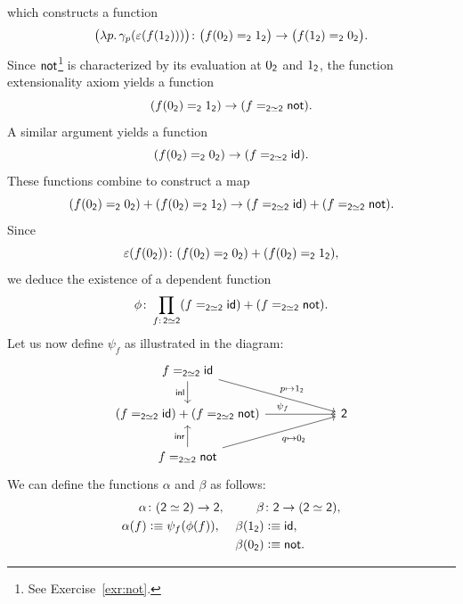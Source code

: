 \begin{solution}
\[    \]
    which constructs a function 
    \begin{align*}
        \bigl(\lambda p.\,\gamma_p(\varepsilon(f(1_{\fun2})))\bigr)
        \colon
        \bigl(f(0_{\fun2})\eq{\fun2}1_{\fun2}\bigr)
        \to
        \bigl(f(1_{\fun2})\eq{\fun2}0_{\fun2}\bigr).        
    \end{align*}
    Since $\mathsf{not}$\footnote{See Exercise~\ref{exr:not}.} is characterized by its evaluation at $0_{\mathsf{2}}$ and $1_{\mathsf{2}}$, the function extensionality axiom yields a function
    \[
        (f(0_{\mathsf{2}})\mathrel{=_{\mathsf{2}}}1_{\mathsf{2}})
            \to(f\mathrel{=_{\mathsf{2}\simeq\mathsf{2}}}\mathsf{not}).
    \]
    A similar argument yields a function
    \[
        (f(0_{\mathsf{2}})\mathrel{=_{\mathsf{2}}}0_{\mathsf{2}})
            \to(f\mathrel{=_{\mathsf{2}\simeq\mathsf{2}}}\mathsf{id}).
    \]
    These functions combine to construct a map
    \[
        (f(0_{\mathsf{2}})\mathrel{=_{\mathsf{2}}}0_{\mathsf{2}})
        +
        (f(0_{\mathsf{2}})\mathrel{=_{\mathsf{2}}}1_{\mathsf{2}})
        \to
        (f\mathrel{=_{\mathsf{2}\simeq\mathsf{2}}}\mathsf{id})
        +
        (f\mathrel{=_{\mathsf{2}\simeq\mathsf{2}}}\mathsf{not}).
    \]
    Since
    \[
        \varepsilon(f(0_{\fun2}))\colon
            (f(0_{\fun2})\eq{\fun2}0_{\fun2})
            +(f(0_{\fun2})\eq{\fun2}1_{\fun2}),
    \]
    we deduce the existence of a dependent function
    \[
        \phi\colon\prod_{f\colon\fun2\simeq\fun2}
            (f\eq{\fun2\simeq\fun2}\id)
            +
            (f\eq{\fun2\simeq\fun2}\fun{not}).
    \]
    Let us now define $\psi_f$ as illustrated in the diagram:
    \[
        \begin{tikzcd}[column sep=2cm]
            f\eq{\fun2\simeq\fun2}\id
                    \arrow[d,"\fun{inl}"']
                    \arrow[rd,"p\mapsto1_{\fun2}"]\\
            (f\eq{\fun2\simeq\fun2}\id)+(f\eq{\fun2\simeq\fun2}\fun{not})
                    \arrow[r,"\psi_f",near start]
                &\fun2\\
            f\eq{\fun2\simeq\fun2}\fun{not}
                    \arrow[u,"\fun{inr}"]
                    \arrow[ru,"q\mapsto0_{\fun2}"']
        \end{tikzcd}
    \]
    We can define the functions $\alpha$ and $\beta$ as follows:
    \begin{align*}
        \alpha&\colon(\fun2\simeq\fun2)\to\fun2,
        &\beta&\colon\fun2\to(\fun2\simeq\fun2),\\
        \alpha(f)&\defeq\psi_f(\phi(f)),
        &\beta(1_{\fun2})&\defeq\id,\\
        &&\beta(0_{\fun2})&\defeq\fun{not}.
    \end{align*}

\end{solution}

